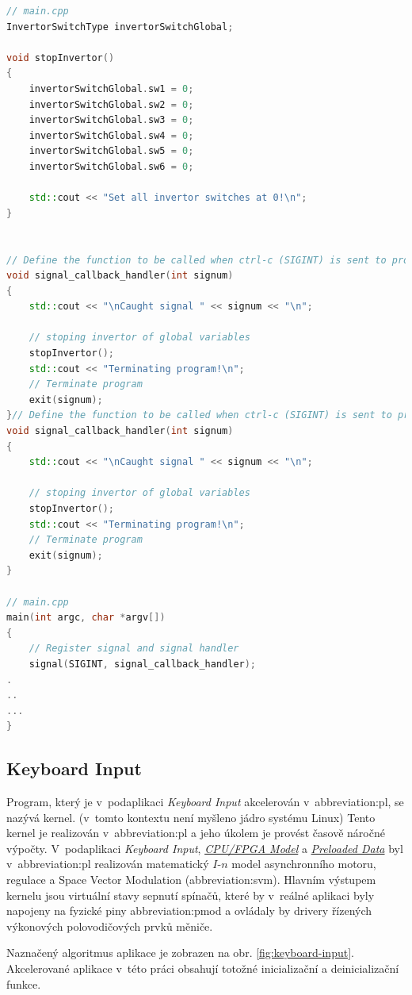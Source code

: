 \documentclass[a4paper, twoside, 11pt]{article}
\newcommand{\fbar}{\FloatBarrier}
\begin{document}
	\begin{lstlisting}[language={c++}, caption={signal\_callback\_handler funkce a její registrace na signál SIGINT.}, label={lst:signall-callback-handler}]
// main.cpp
InvertorSwitchType invertorSwitchGlobal;

void stopInvertor()
{
    invertorSwitchGlobal.sw1 = 0;
    invertorSwitchGlobal.sw2 = 0;
    invertorSwitchGlobal.sw3 = 0;
    invertorSwitchGlobal.sw4 = 0;
    invertorSwitchGlobal.sw5 = 0;
    invertorSwitchGlobal.sw6 = 0;

    std::cout << "Set all invertor switches at 0!\n";
}


// Define the function to be called when ctrl-c (SIGINT) is sent to process
void signal_callback_handler(int signum)
{
    std::cout << "\nCaught signal " << signum << "\n";

    // stoping invertor of global variables
    stopInvertor();
    std::cout << "Terminating program!\n";
    // Terminate program
    exit(signum);
}// Define the function to be called when ctrl-c (SIGINT) is sent to process
void signal_callback_handler(int signum)
{
    std::cout << "\nCaught signal " << signum << "\n";

    // stoping invertor of global variables
    stopInvertor();
    std::cout << "Terminating program!\n";
    // Terminate program
    exit(signum);
}

// main.cpp
main(int argc, char *argv[])
{
	// Register signal and signal handler
	signal(SIGINT, signal_callback_handler);
.
..
...
}\end{lstlisting}

	\fbar
	\subsection{Keyboard Input}\label{subsec:keyboard-input}
		Program, který je v~podaplikaci \textit{Keyboard Input} akcelerován v~\gls{abbreviation:pl}, se nazývá kernel. (v~tomto kontextu není myšleno jádro systému Linux) Tento kernel je realizován v~\gls{abbreviation:pl} a jeho úkolem je provést časově náročné výpočty. V~podaplikaci \textit{Keyboard Input}, \hyperref[subsec:cpu-fpga]{\textit{CPU/FPGA Model}} a \hyperref[subsec:preloaded-data]{\textit{Preloaded Data}} byl v~\gls{abbreviation:pl} realizován matematický $I$-$n$ model asynchronního motoru, regulace a Space Vector Modulation (\gls{abbreviation:svm}). Hlavním výstupem kernelu jsou virtuální stavy sepnutí spínačů, které by v~reálné aplikaci byly napojeny na fyzické piny \gls{abbreviation:pmod} a ovládaly by drivery řízených výkonových polovodičových prvků měniče.\par
		Naznačený algoritmus aplikace je zobrazen na obr. \ref{fig:keyboard-input}. Akcelerované aplikace v~této práci obsahují totožné inicializační a deinicializační funkce.\par
\end{document}
